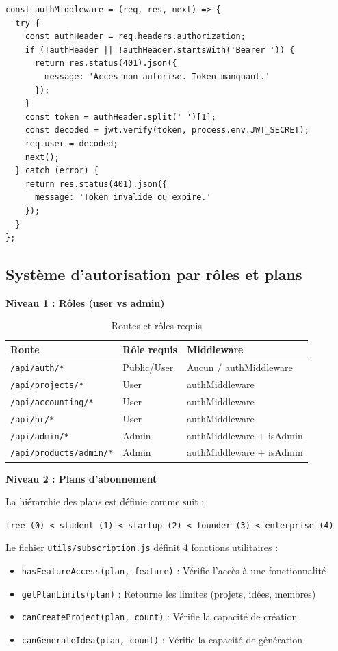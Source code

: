 \begin{verbatim}
const authMiddleware = (req, res, next) => {
  try {
    const authHeader = req.headers.authorization;
    if (!authHeader || !authHeader.startsWith('Bearer ')) {
      return res.status(401).json({
        message: 'Acces non autorise. Token manquant.'
      });
    }
    const token = authHeader.split(' ')[1];
    const decoded = jwt.verify(token, process.env.JWT_SECRET);
    req.user = decoded;
    next();
  } catch (error) {
    return res.status(401).json({
      message: 'Token invalide ou expire.'
    });
  }
};
\end{verbatim}

\subsection{Système d'autorisation par rôles et plans}

\textbf{Niveau 1 : Rôles (user vs admin)}

\begin{table}[H]
\centering
\caption{Routes et rôles requis}
\label{tab:routes-roles}
\begin{tabular}{|l|l|l|}
\hline
\textbf{Route} & \textbf{Rôle requis} & \textbf{Middleware} \\
\hline
\texttt{/api/auth/*} & Public/User & Aucun / authMiddleware \\
\hline
\texttt{/api/projects/*} & User & authMiddleware \\
\hline
\texttt{/api/accounting/*} & User & authMiddleware \\
\hline
\texttt{/api/hr/*} & User & authMiddleware \\
\hline
\texttt{/api/admin/*} & Admin & authMiddleware + isAdmin \\
\hline
\texttt{/api/products/admin/*} & Admin & authMiddleware + isAdmin \\
\hline
\end{tabular}
\end{table}

\textbf{Niveau 2 : Plans d'abonnement}

La hiérarchie des plans est définie comme suit :
\begin{center}
\texttt{free (0) < student (1) < startup (2) < founder (3) < enterprise (4)}
\end{center}

Le fichier \texttt{utils/subscription.js} définit 4 fonctions utilitaires :
\begin{itemize}
    \item \texttt{hasFeatureAccess(plan, feature)} : Vérifie l'accès à une fonctionnalité
    \item \texttt{getPlanLimits(plan)} : Retourne les limites (projets, idées, membres)
    \item \texttt{canCreateProject(plan, count)} : Vérifie la capacité de création
    \item \texttt{canGenerateIdea(plan, count)} : Vérifie la capacité de génération
\end{itemize}

